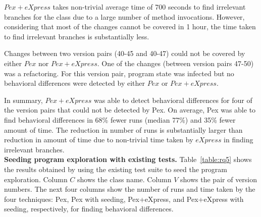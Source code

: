   $Pex+eXpress$ takes non-trivial average time of 700 seconds to find irrelevant branches for the class  due to a large number of method invocations. However, considering that most of the changes cannot be covered in 1 hour, the time taken to find irrelevant branches is substantially less. 
  
  Changes between two version pairs (40-45 and 40-47) could not be covered by either $Pex$ nor $Pex+eXpress$. One of the changes (between version pairs 47-50) was a refactoring. For this version pair, program state was infected but no behavioral differences were detected by either $Pex$ or $Pex+eXpress$.
   
  In summary, $Pex+eXpress$ was able to detect behavioral differences for four of the version pairs that could not be detected by Pex. On average, Pex was able to find behavioral differences in 68\% fewer runs (median 77\%) and 35\% fewer amount of time. 
  The reduction in number of runs is substantially larger than reduction in amount of time due to non-trivial time taken by 
  $eXpress$ in finding irrelevant branches.
\\ \textbf{Seeding program exploration with existing tests.} Table~\ref{table:rq5} shows the results obtained by using the existing test suite to seed the program exploration. Column $C$ shows the class name. Column $V$ shows the pair of version numbers. The next four columns show the number of runs and time taken by the four techniques: Pex, Pex with seeding, Pex+eXpress, and Pex+eXpress with seeding, respectively, for  finding behavioral differences. 
